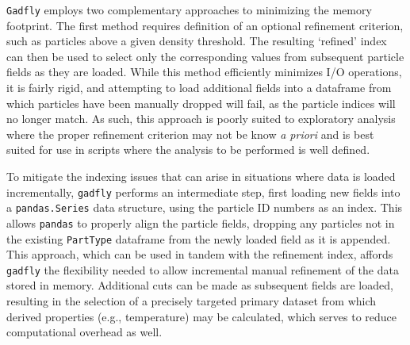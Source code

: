 \documentclass{emulateapj}
\newcommand{\code}[1]{\texttt{#1}}
\begin{document}
\code{Gadfly} employs two complementary approaches to minimizing the memory footprint.
The first method requires definition of an optional refinement criterion, such as particles above a given density threshold.
The resulting `refined' index can then be used to select only the corresponding values from subsequent particle fields as they are loaded.
While this method efficiently minimizes I/O operations, it is fairly rigid, and attempting to load additional fields into a dataframe from which particles have been manually dropped will fail, as the particle indices will no longer match.  
As such, this approach is poorly suited to exploratory analysis where the proper refinement criterion may not be know {\it{a priori}} and is best suited for use in scripts where the analysis to be performed is well defined.

To mitigate the indexing issues that can arise in situations where data is loaded incrementally, \code{gadfly} performs an intermediate step, first loading new fields into a \code{pandas.Series} data structure, using the particle ID numbers as an index.  This allows \code{pandas} to properly align the particle fields, dropping any particles not in the existing \code{PartType} dataframe from the newly loaded field as it is appended.
This approach, which can be used in tandem with the refinement index, affords \code{gadfly} the flexibility needed to allow incremental manual refinement of the data stored in memory. 
Additional cuts can be made as subsequent fields are loaded, resulting in the selection of a precisely targeted primary dataset from which derived  properties (e.g., temperature) may be calculated, which serves to reduce computational overhead as well.
\end{document}
